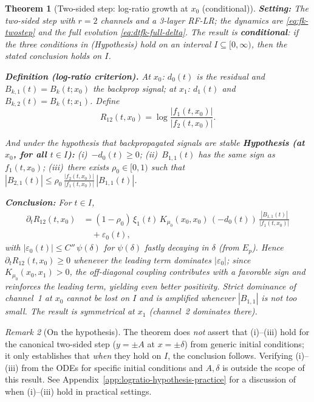\documentclass[nohyperref]{article}
\theoremstyle{plain}
\newtheorem{theorem}{Theorem}[section]
\theoremstyle{definition}
\theoremstyle{remark}
\newtheorem{remark}[theorem]{Remark}
\begin{document}
\begin{theorem}[Two-sided step: log-ratio growth at $x_0$ (conditional)]
\label{thm:r2-logratio-criterion-main}
\medskip
\textbf{Setting:} The two-sided step with $r=2$ channels and a 3-layer RF-LR; the dynamics are \eqref{eq:fk-twostep} and the full evolution \eqref{eq:dtfk-full-delta}. The result is \textbf{conditional}: \emph{if} the three conditions in (Hypothesis) hold on an interval $I \subseteq [0,\infty)$, \emph{then} the stated conclusion holds on $I$.

\medskip
\noindent\textbf{Definition (log-ratio criterion).} At $x_0$: $d_0(t)$ is the residual and $B_{k,1}(t)=B_k(t;x_0)$ the backprop signal; at $x_1$: $d_1(t)$ and $B_{k,2}(t)=B_k(t;x_1)$. Define
\[
R_{12}(t,x_0) = \log\frac{|f_1(t,x_0)|}{|f_2(t,x_0)|}.
\]

\medskip
And under the hypothesis that backpropagated signals are stable
\noindent\textbf{Hypothesis (at $x_0$, for all $t\in I$):} (i)~$-d_0(t)\ge 0$; (ii)~$B_{1,1}(t)$ has the same sign as $f_1(t,x_0)$; (iii)~there exists $\rho_0\in[0,1)$ such that $|B_{2,1}(t)|\le \rho_0\,\frac{|f_2(t,x_0)|}{|f_1(t,x_0)|}\,|B_{1,1}(t)|$.

\medskip
\noindent\textbf{Conclusion:} For $t\in I$,
\[
\begin{aligned}
\partial_t R_{12}(t,x_0) &= (1-\rho_0)\,\xi_1(t)\,K_{\mu_0}(x_0,x_0)\,(-d_0(t))\,\frac{|B_{1,1}(t)|}{|f_1(t,x_0)|} \\
&\quad + \varepsilon_0(t),
\end{aligned}
\]
with $|\varepsilon_0(t)|\le C''\,\psi(\delta)$ for $\psi(\delta)$ fastly decaying in $\delta$ (from $E_p$). Hence $\partial_t R_{12}(t,x_0)\ge 0$ whenever the leading term dominates $|\varepsilon_0|$; since $K_{\mu_0}(x_0,x_1)>0$, the off-diagonal coupling contributes with a favorable sign and reinforces the leading term, yielding even better positivity. Strict dominance of channel~1 at $x_0$ cannot be lost on $I$ and is amplified whenever $|B_{1,1}|$ is not too small. The result is symmetrical at $x_1$ (channel~2 dominates there).
\end{theorem}

\begin{remark}[On the hypothesis]
The theorem does \emph{not} assert that (i)--(iii) hold for the canonical two-sided step ($y=\pm A$ at $x=\pm\delta$) from generic initial conditions; it only establishes that \emph{when} they hold on $I$, the conclusion follows. Verifying (i)--(iii) from the ODEs for specific initial conditions and $A,\delta$ is outside the scope of this result. See Appendix~\ref{app:logratio-hypothesis-practice} for a discussion of when (i)--(iii) hold in practical settings.
\end{remark}
\end{document}
